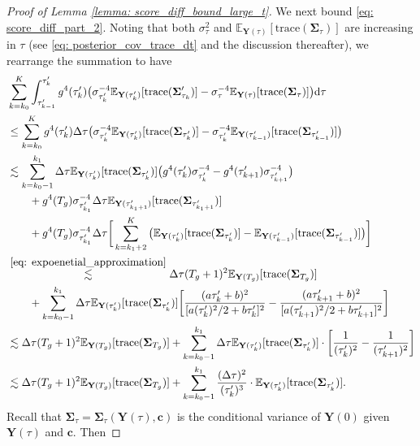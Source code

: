 \documentclass[11pt]{article}
\newcommand{\mE}{\mathbb{E}}
\newcommand{\bY}{\mathbf{Y}}
\newcommand{\bc}{\mathbf{c}}
\newcommand{\bSimga}{\boldsymbol{\Sigma}}
\newcommand{\intd}{\mathrm{d}}
\begin{document}
\begin{proof}[Proof of Lemma \ref{lemma: score_diff_bound_large_t}]
We next bound \eqref{eq: score_diff_part_2}. Noting that both $\sigma_\tau^2$ and $\mE_{\bY(\tau)}[\text{trace}(\bSimga_{\tau})]$ are increasing in $\tau$ (see \eqref{eq: posterior_cov_trace_dt} and the discussion thereafter), we  rearrange the summation to have
\begin{align}
    &\sum_{k=k_0}^{K}\int_{\tau_{k - 1}'}^{\tau_k'}g^4(\tau_k') \big(\sigma_{\tau_k'}^{-4}\mE_{\bY(\tau_k')}[\text{trace}(\bSimga_{\tau_k}')] - \sigma_{\tau}^{-4}\mE_{\bY(\tau)}[\text{trace}(\bSimga_{\tau})]\big)\intd\tau \nonumber\\
    &\le \sum_{k=k_0}^{K}g^4(\tau_k')\Delta\tau \big(\sigma_{\tau_k'}^{-4}\mE_{\bY(\tau_k')}[\text{trace}(\bSimga_{\tau_k'})] - \sigma_{\tau_k'}^{-4}\mE_{\bY(\tau_{k - 1}')}[\text{trace}(\bSimga_{\tau_{k - 1}'})]\big)\nonumber\\
    &\lesssim  \sum_{k=k_0 - 1}^{k_1} \Delta\tau\mE_{\bY(\tau_k')}[\text{trace}(\bSimga_{\tau_k'})] \big(g^4(\tau_k')\sigma_{\tau_k'}^{-4} - g^4(\tau_{k + 1}')\sigma_{\tau_{k + 1}'}^{-4}\big) \nonumber\\
    &\qquad + g^4(T_g)\sigma_{\tau_{k_1}'}^{-4}\Delta\tau \mE_{\bY(\tau_{k_1 + 1}')}[\text{trace}(\bSimga_{\tau_{k_1 + 1}'})]  \nonumber\\
    &\qquad + g^4(T_g)\sigma_{\tau_{k_1}'}^{-4}\Delta\tau \bigg[\sum_{k=k_1 + 2}^{K}\big(\mE_{\bY(\tau_{k}')}[\text{trace}(\bSimga_{\tau_{k}'})] - \mE_{\bY(\tau_{k - 1}')}[\text{trace}(\bSimga_{\tau_{k - 1}'})]\big)\bigg] \nonumber\\
    &\overset{\eqref{eq: expoenetial_approximation}}{\lesssim} \Delta\tau(T_g + 1)^2\mE_{\bY(T_g)}[\text{trace}(\bSimga_{T_g})] \nonumber\\
    &\qquad +\sum_{k=k_0 - 1}^{k_1} \Delta\tau\mE_{\bY(\tau_k')}[\text{trace}(\bSimga_{\tau_k'})]\bigg[\frac{(a\tau_k' + b)^2}{[a(\tau_k')^2/2 + b\tau_k']^{2}} - \frac{(a\tau_{k + 1}' + b)^2}{[a(\tau_{k + 1}')^2/2 + b\tau_{k + 1}']^{2}}\bigg] \nonumber\\
    &\lesssim \Delta\tau(T_g + 1)^2\mE_{\bY(T_g)}[\text{trace}(\bSimga_{T_g})] + \sum_{k=k_0 - 1}^{k_1} \Delta\tau\mE_{\bY(\tau_k')}[\text{trace}(\bSimga_{\tau_k'})]\cdot\bigg[\frac{1}{(\tau_k')^2} - \frac{1}{(\tau_{k + 1}')^2}\bigg] \nonumber\\
    &\lesssim \Delta\tau(T_g + 1)^2\mE_{\bY(T_g)}[\text{trace}(\bSimga_{T_g})] + \sum_{k=k_0 - 1}^{k_1} \frac{(\Delta\tau)^2}{(\tau_k')^3}\cdot\mE_{\bY(\tau_k')}[\text{trace}(\bSimga_{\tau_k'})]. \label{eq: posterior_trace_diff}
\end{align}
Recall that $\bSimga_{\tau} = \bSimga_{\tau}(\bY(\tau), \bc)$ is the conditional variance of $\bY(0)$ given $\bY(\tau)$ and $\bc$. Then

\end{proof}
\end{document}
